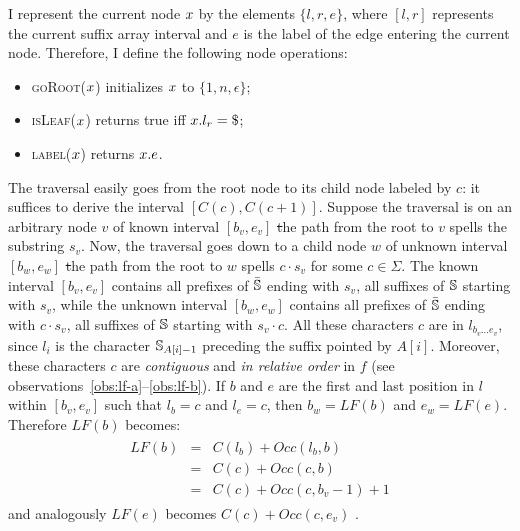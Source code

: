 I represent the current node $x$ by the elements $\{ l, r, e \}$, where $[l,r]$ represents the current suffix array interval and $e$ is the label of the edge entering the current node.
Therefore, I define the following node operations:
\begin{itemize}
\item \textsc{goRoot}($x$) initializes $x$ to $\{ 1, n, \epsilon \}$;
\item \textsc{isLeaf}($x$) returns true iff $\Tn.l_r = \$$;
\item \textsc{label}($x$) returns $x.e$.
\end{itemize}

The traversal easily goes from the root node to its child node labeled by $c$: it suffices to derive the interval $[C(c),C(c+1)]$.
Suppose the traversal is on an arbitrary node $v$ of known interval $[b_v, e_v]$ \st the path from the root to $v$ spells the substring $s_v$.
Now, the traversal goes down to a child node $w$ of unknown interval $[b_w, e_w]$ \st the path from the root to $w$ spells $c \cdot s_v$ for some $c \in \Sigma$.
The known interval $[b_v, e_v]$ contains all prefixes of $\bar{\mathbb {S}}$ ending with $s_v$, \ie all suffixes of $\mathbb {S}$ starting with $s_v$, while the unknown interval $[b_w, e_w]$ contains all prefixes of $\bar{\mathbb {S}}$ ending with $c \cdot s_v$, \ie all suffixes of $\mathbb {S}$ starting with $s_v \cdot c$.
All these characters $c$ are in $l_{b_v \dots e_v}$, since $l_i$ is the character $\mathbb {S}_{A[i] - 1}$ preceding the suffix pointed by $A[i]$.
Moreover, these characters $c$ are \emph{contiguous} and \emph{in relative order} in $f$ (see observations~\ref{obs:lf-a}--\ref{obs:lf-b}).
If $b$ and $e$ are the first and last position in $l$ within $[b_v, e_v]$ such that $l_b = c$ and $l_e = c$, then $b_w = LF(b)$ and $e_w = LF(e)$.
Therefore $LF(b)$ becomes:
\begin{eqnarray}
\begin{array}{lcl}
LF(b) &=& C(l_b) + Occ(l_b, b)\\
 	  &=& C(c) + Occ(c, b)\\
	  &=& C(c) + Occ(c, b_v - 1) + 1
\end{array}
\end{eqnarray}
and analogously $LF(e)$ becomes $C(c) + Occ(c, e_v)$ \cite{Ferragina2000}.

